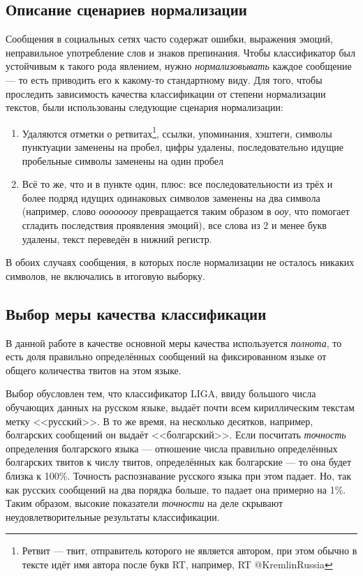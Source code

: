 \documentclass[a4paper, 14pt]{article}
\begin{document}
		\subsection{Описание сценариев нормализации}	
		Сообщения в социальных сетях часто содержат ошибки, выражения эмоций, неправильное употребление слов и знаков препинания. Чтобы классификатор
		был устойчивым к такого рода явлением, нужно \textit{нормализовывать}	 каждое сообщение --- то есть приводить его к какому-то стандартному виду.
		Для того, чтобы проследить зависимость качества классификации от степени нормализации текстов, были использованы следующие сценария нормализации:
		\begin{enumerate}
			\item Удаляются отметки о ретвитах\footnote{Ретвит --- твит, отправитель которого не является автором, при этом обычно в тексте идёт имя автора после букв RT, например, RT @KremlinRussia}, ссылки, упоминания, хэштеги, символы пунктуации заменены на пробел, цифры удалены, последовательно идущие пробельные символы заменены на один пробел
			\item Всё то же, что и в пункте один, плюс: все последовательности из трёх и более подряд идущих одинаковых символов заменены на два символа (например, слово \textit{оооооооу} превращается таким образом в \textit{ооу}, что помогает сгладить последствия проявления эмоций), все слова из 2 и менее букв удалены, текст переведён в нижний регистр.
		\end{enumerate}
		В обоих случаях сообщения, в которых после нормализации не осталось никаких символов, не включались в итоговую выборку.
		
		\subsection{Выбор меры качества классификации}
		В данной работе в качестве основной меры качества используется \textit{полнота}, то есть доля правильно определённых сообщений на фиксированном языке
		от общего количества твитов на этом языке.
		
		Выбор обусловлен тем, что классификатор LIGA, ввиду большого числа обучающих данных на русском языке,
		выдаёт почти всем кириллическим текстам метку <<русский>>. В то же время, на несколько десятков, например, болгарских сообщений он выдаёт 
		<<болгарский>>. Если посчитать \textit{точность} определения болгарского языка --- отношение числа правильно определённых болгарских твитов 
		к числу твитов, определённых как болгарские --- то она будет близка к 100\%. Точность распознавание русского языка при этом падает.
		Но, так как русских сообщений на два порядка больше, то падает она примерно на 1\%. Таким образом, высокие показатели \textit{точности} на деле
		скрывают неудовлетворительные результаты классификации.
		
\end{document}
